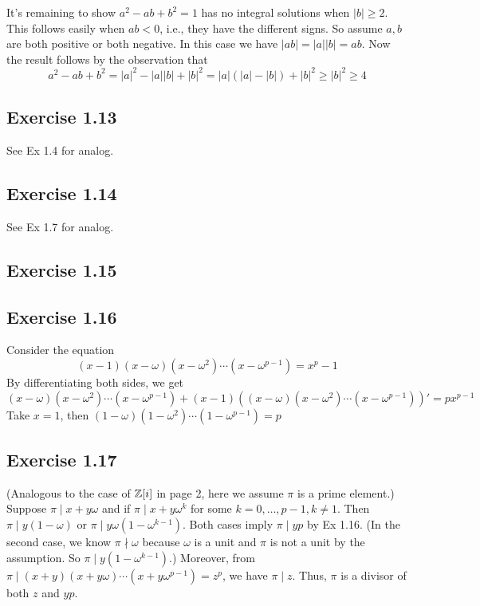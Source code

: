 \documentclass[../Marcus.tex]{subfiles}
\begin{document}
It's remaining to show $a^2-ab+b^2=1$ has no integral solutions when $|b|\geq 2$. This follows easily when $ab<0$, i.e., they have the different signs. So assume $a,b$ are both positive or both negative. In this case we have $|ab|=|a||b|=ab$. Now the result follows by the observation that $$a^2-ab+b^2=|a|^2-|a||b|+|b|^2=|a|(|a|-|b|)+|b|^2\geq |b|^2\geq 4$$

\subsection*{Exercise 1.13}

See Ex 1.4 for analog.

\subsection*{Exercise 1.14}

See Ex 1.7 for analog.

\subsection*{Exercise 1.15}

\subsection*{Exercise 1.16}

Consider the equation $$(x-1)(x-\omega)(x-\omega^2)\cdots(x-\omega^{p-1})=x^p-1$$ By differentiating both sides, we get $$(x-\omega)(x-\omega^2)\cdots(x-\omega^{p-1})+(x-1)\left ( (x-\omega)(x-\omega^2)\cdots(x-\omega^{p-1}) \right )'=px^{p-1}$$
Take $x=1$, then $(1-\omega)(1-\omega^2)\cdots(1-\omega^{p-1})=p$

\subsection*{Exercise 1.17}

(Analogous to the case of $\mathbb{Z}[i]$ in page 2, here we assume $\pi$ is a prime element.) Suppose $\pi\mid x+y\omega$ and if $\pi\mid x+y\omega^k$ for some $k=0,\ldots,p-1,k\neq 1$. Then $\pi\mid y(1-\omega)$ or $\pi\mid y\omega(1-\omega^{k-1})$. Both cases imply $\pi\mid yp$ by Ex 1.16. (In the second case, we know $\pi\nmid \omega$ because $\omega$ is a unit and $\pi$ is not a unit by the assumption. So $\pi\mid y(1-\omega^{k-1})$.) Moreover, from $\pi\mid (x+y)(x+y\omega)\cdots(x+y\omega^{p-1})=z^p$, we have $\pi\mid z$. Thus, $\pi$ is a divisor of both $z$ and $yp$.
\end{document}
